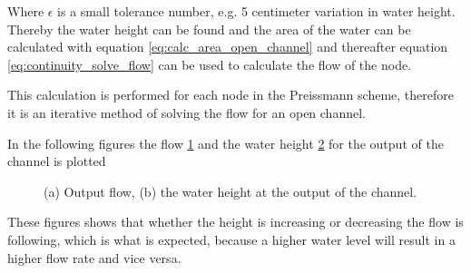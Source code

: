 Where $\epsilon$ is a small tolerance number, e.g. 5 centimeter variation in water height. Thereby the water height can be found and the area of the water can be calculated with equation \ref{eq:calc_area_open_channel}  and thereafter equation \ref{eq:continuity_solve_flow} can be used to calculate the flow of the node.

This calculation is performed for each node in the Preissmann scheme, therefore it is an iterative method of solving the flow for an open channel.


In the following figures the flow \ref{fig:simulation_output_flow_height_a} and the water height \ref{fig:simulation_output_flow_height_b} for the output of the channel is plotted


\begin{figure}[H]
\centering
\begin{subfigure}{.5\textwidth}
  \centering
  
  \caption{}
  \label{fig:simulation_output_flow_height_a}
\end{subfigure}%
\begin{subfigure}{.4\textwidth}
  \centering
 
  \caption{}
   \label{fig:simulation_output_flow_height_b}
\end{subfigure}
\caption{(a) Output flow, (b) the water height at the output of the channel.}
\label{fig:simulation_output_flow_height}
\end{figure}

These figures shows that whether the height is increasing or decreasing the flow is following, which is what is expected, because a higher water level will result in a higher flow rate and vice versa.
